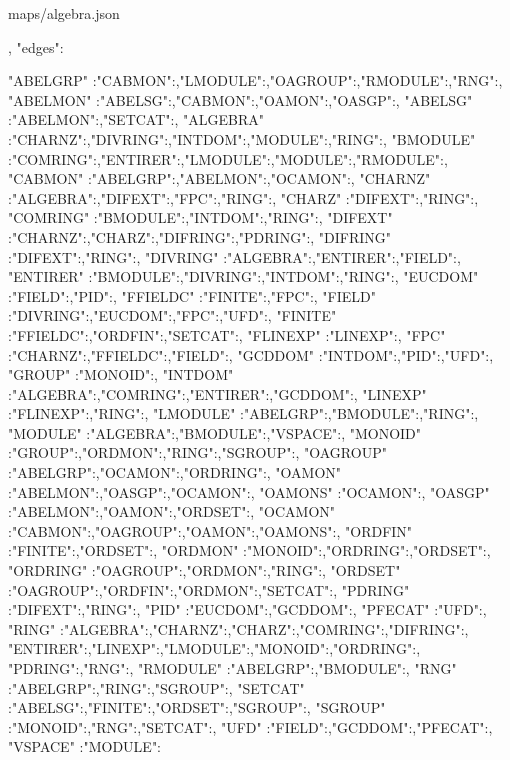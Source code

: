 \documentclass{article}
\begin{document}
\begin{chunk}{maps/algebra.json}
{{ },
 "edges":
 {
  "ABELGRP" :{"CABMON":{},"LMODULE":{},"OAGROUP":{},"RMODULE":{},"RNG":{}},
  "ABELMON" :{"ABELSG":{},"CABMON":{},"OAMON":{},"OASGP":{}},
  "ABELSG"  :{"ABELMON":{},"SETCAT":{}},
  "ALGEBRA" :{"CHARNZ":{},"DIVRING":{},"INTDOM":{},"MODULE":{},"RING":{}}, 
  "BMODULE" :{"COMRING":{},"ENTIRER":{},"LMODULE":{},"MODULE":{},"RMODULE":{}},
  "CABMON"  :{"ABELGRP":{},"ABELMON":{},"OCAMON":{}},
  "CHARNZ"  :{"ALGEBRA":{},"DIFEXT":{},"FPC":{},"RING":{}},
  "CHARZ"   :{"DIFEXT":{},"RING":{}},
  "COMRING" :{"BMODULE":{},"INTDOM":{},"RING":{}},
  "DIFEXT"  :{"CHARNZ":{},"CHARZ":{},"DIFRING":{},"PDRING":{}},
  "DIFRING" :{"DIFEXT":{},"RING":{}},
  "DIVRING" :{"ALGEBRA":{},"ENTIRER":{},"FIELD":{}}, 
  "ENTIRER" :{"BMODULE":{},"DIVRING":{},"INTDOM":{},"RING":{}}, 
  "EUCDOM"  :{"FIELD":{},"PID":{}},
  "FFIELDC" :{"FINITE":{},"FPC":{}},
  "FIELD"   :{"DIVRING":{},"EUCDOM":{},"FPC":{},"UFD":{}},
  "FINITE"  :{"FFIELDC":{},"ORDFIN":{},"SETCAT":{}},
  "FLINEXP" :{"LINEXP":{}},
  "FPC"     :{"CHARNZ":{},"FFIELDC":{},"FIELD":{}},
  "GCDDOM"  :{"INTDOM":{},"PID":{},"UFD":{}},
  "GROUP"   :{"MONOID":{}},
  "INTDOM"  :{"ALGEBRA":{},"COMRING":{},"ENTIRER":{},"GCDDOM":{}},
  "LINEXP"  :{"FLINEXP":{},"RING":{}},
  "LMODULE" :{"ABELGRP":{},"BMODULE":{},"RING":{}},
  "MODULE"  :{"ALGEBRA":{},"BMODULE":{},"VSPACE":{}},
  "MONOID"  :{"GROUP":{},"ORDMON":{},"RING":{},"SGROUP":{}},
  "OAGROUP" :{"ABELGRP":{},"OCAMON":{},"ORDRING":{}},
  "OAMON"   :{"ABELMON":{},"OASGP":{},"OCAMON":{}},
  "OAMONS"  :{"OCAMON":{}},
  "OASGP"   :{"ABELMON":{},"OAMON":{},"ORDSET":{}},
  "OCAMON"  :{"CABMON":{},"OAGROUP":{},"OAMON":{},"OAMONS":{}},
  "ORDFIN"  :{"FINITE":{},"ORDSET":{}},
  "ORDMON"  :{"MONOID":{},"ORDRING":{},"ORDSET":{}},
  "ORDRING" :{"OAGROUP":{},"ORDMON":{},"RING":{}},
  "ORDSET"  :{"OAGROUP":{},"ORDFIN":{},"ORDMON":{},"SETCAT":{}},
  "PDRING"  :{"DIFEXT":{},"RING":{}},
  "PID"     :{"EUCDOM":{},"GCDDOM":{}},
  "PFECAT"  :{"UFD":{}},
  "RING"    :{"ALGEBRA":{},"CHARNZ":{},"CHARZ":{},"COMRING":{},"DIFRING":{},
              "ENTIRER":{},"LINEXP":{},"LMODULE":{},"MONOID":{},"ORDRING":{},
              "PDRING":{},"RNG":{}},
  "RMODULE" :{"ABELGRP":{},"BMODULE":{}},
  "RNG"     :{"ABELGRP":{},"RING":{},"SGROUP":{}},
  "SETCAT"  :{"ABELSG":{},"FINITE":{},"ORDSET":{},"SGROUP":{}},
  "SGROUP"  :{"MONOID":{},"RNG":{},"SETCAT":{}},
  "UFD"     :{"FIELD":{},"GCDDOM":{},"PFECAT":{}},
  "VSPACE"  :{"MODULE":{}}

 }
}\end{chunk}
\end{document}

